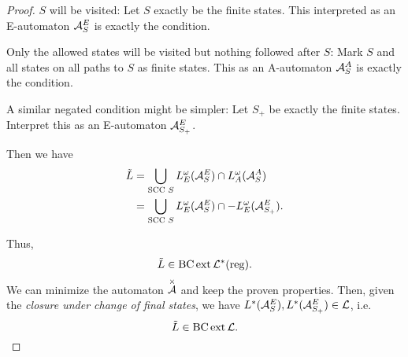 \begin{theorem}
\begin{proof}
$S$ will be visited: Let $S$ exactly be the finite states. This interpreted as an E-automaton $\mathcal{A}^E_S$ is exactly the condition.

Only the allowed states will be visited but nothing followed after $S$: Mark $S$ and all states on all paths to $S$ as finite states. This as an A-automaton $\mathcal{A}^A_S$ is exactly the condition.

A similar negated condition might be simpler: Let $S_+$ be exactly the finite states. Interpret this as an E-automaton $\mathcal{A}^E_{S_+}$.

Then we have
\begin{align*}
\tilde L & = \bigcup_{\text{SCC } S} L^\omega_E (\mathcal{A}^E_S) \cap L^\omega_A (\mathcal{A}^A_S) \\
& = \bigcup_{\text{SCC } S} L^\omega_E (\mathcal{A}^E_S) \cap -L^\omega_E (\mathcal{A}^E_{S_+}) .
\end{align*}

Thus,
\[ \tilde L \in \operatorname{BC} \operatorname{ext} \mathcal{L}^*(\textup{\textrm{reg}}) . \]
We can minimize the automaton $\overset{\times}{\mathcal{A}}$ and keep the proven properties. Then, given the \emph{closure under change of final states}, we have $L^*(\mathcal{A}^E_S), L^*(\mathcal{A}^E_{S_+}) \in \mathcal{L}$, i.e.
\[ \tilde L \in \operatorname{BC} \operatorname{ext} \mathcal{L} . \]
\end{proof}
\end{theorem}

